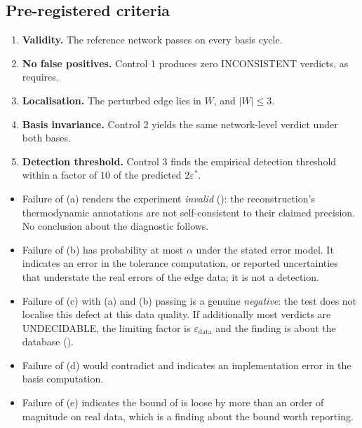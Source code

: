 \documentclass[11pt,a4paper]{article}
\theoremstyle{definition}
\theoremstyle{remark}
\newcommand{\abs}[1]{\lvert#1\rvert}
\newcommand{\eps}{\varepsilon}
\newcommand{\epsdata}{\eps_{\mathrm{data}}}
\newcommand{\epsstar}{\eps^{\ast}}
\begin{document}
\subsection*{Pre-registered criteria}

\begin{criterion}[Success]
\label{crit:success}
\leavevmode
\begin{enumerate}[label=(\alph*),leftmargin=2em,itemsep=2pt]
\item \textbf{Validity.} The reference network passes
 on every basis cycle.
\item \textbf{No false positives.} Control 1 produces zero
\textsf{INCONSISTENT} verdicts, as 
requires.
\item \textbf{Localisation.} The perturbed edge lies in $W$, and
$\abs{W}\le 3$.
\item \textbf{Basis invariance.} Control 2 yields the same network-level
verdict under both bases.
\item \textbf{Detection threshold.} Control 3 finds the empirical
detection threshold within a factor of $10$ of the predicted
$2\epsstar$.
\end{enumerate}
\end{criterion}

\begin{criterion}
\label{crit:failure}
\leavevmode
\begin{itemize}[leftmargin=1.5em,itemsep=2pt]
\item Failure of (a) renders the experiment \emph{invalid}
(): the reconstruction's thermodynamic annotations
are not self-consistent to their claimed precision. No conclusion about
the diagnostic follows.
\item Failure of (b) has probability at most $\alpha$ under the stated
error model. It indicates an error in the tolerance computation, or
reported uncertainties that understate the real errors of the edge
data; it is not a detection.
\item Failure of (c) with (a) and (b) passing is a genuine
\emph{negative}: the test does not localise this defect at this data
quality. If additionally most verdicts are \textsf{UNDECIDABLE}, the
limiting factor is $\epsdata$ and the finding is about the database
().
\item Failure of (d) would contradict  and
indicates an implementation error in the basis computation.
\item Failure of (e) indicates the bound of  is
loose by more than an order of magnitude on real data, which is a
finding about the bound worth reporting.
\end{itemize}
\end{criterion}
\end{document}
